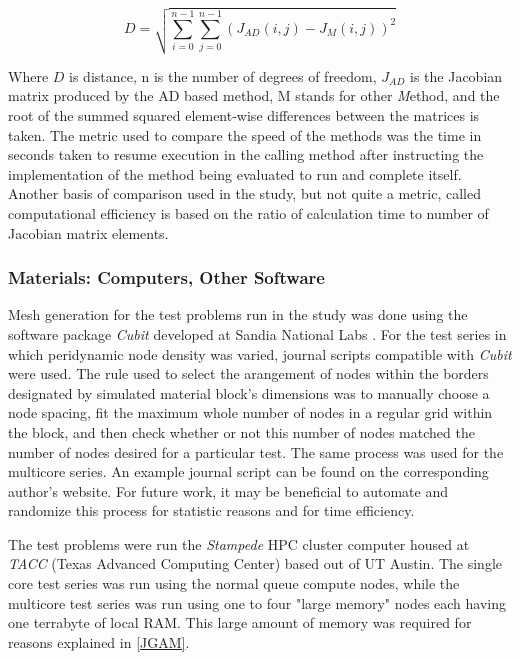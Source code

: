 \documentclass[preprint,12pt]{elsarticle}
\begin{document}
\begin{equation} D = \sqrt{\sum_{i=0}^{n-1}\sum_{j=0}^{n-1} (J_{AD}(i,j) - J_{M}(i,j))^2}
\end{equation}

Where $D$ is distance, n is the number of degrees of freedom, $J_{AD}$ is the Jacobian matrix
produced by the AD based method, M stands for other \emph{M}ethod, and the root of the summed
squared element-wise differences between the matrices is taken.  The metric used to compare the
speed of the methods was the time in seconds taken to resume execution in the calling method after
instructing the implementation of the method being evaluated to run and complete itself. Another
basis of comparison used in the study, but not quite a metric, called computational efficiency is
based on the ratio of calculation time to number of Jacobian matrix elements.

\subsubsection{Materials: Computers, Other Software} 

Mesh generation for the test problems run in the study was done using the software package
\emph{Cubit} developed at Sandia National Labs \cite{ref-Cubit}. For the test series in which peridynamic node density was
varied, journal scripts compatible with \emph{Cubit} were used. The rule used to select the
arangement of nodes within the borders designated by simulated material block's dimensions was to
manually choose a node spacing, fit the maximum whole number of nodes in a regular grid within the
block, and then check whether or not this number of nodes matched the number of nodes desired for a
particular test. The same process was used for the multicore series. An example journal script can
be found on the corresponding author's website. For future work, it may be beneficial to automate
and randomize this process for statistic reasons and for time efficiency. 

The test problems were run the \emph{Stampede} HPC cluster computer housed at \emph{TACC} (Texas
Advanced Computing Center) based out of UT Austin. The single core test series was run using the
normal queue compute nodes, while the multicore test series was run using one to four "large memory"
nodes each having one terrabyte of local RAM. This large amount of memory was required for reasons
explained in \ref{JGAM}.  
\end{document}
